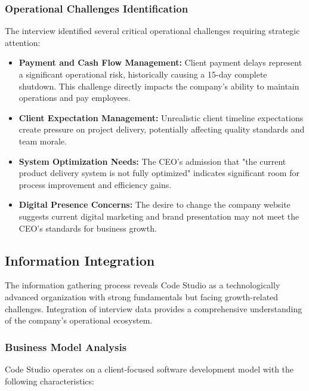 \documentclass[12pt,a4paper]{article}
\begin{document}
\subsubsection{Operational Challenges Identification}

The interview identified several critical operational challenges requiring strategic attention:

\begin{itemize}
    \item \textbf{Payment and Cash Flow Management:} Client payment delays represent a significant operational risk, historically causing a 15-day complete shutdown. This challenge directly impacts the company's ability to maintain operations and pay employees.
    
    \item \textbf{Client Expectation Management:} Unrealistic client timeline expectations create pressure on project delivery, potentially affecting quality standards and team morale.
    
    \item \textbf{System Optimization Needs:} The CEO's admission that "the current product delivery system is not fully optimized" indicates significant room for process improvement and efficiency gains.
    
    \item \textbf{Digital Presence Concerns:} The desire to change the company website suggests current digital marketing and brand presentation may not meet the CEO's standards for business growth.
\end{itemize}

\subsection{Information Integration}

The information gathering process reveals Code Studio as a technologically advanced organization with strong fundamentals but facing growth-related challenges. Integration of interview data provides a comprehensive understanding of the company's operational ecosystem.

\subsubsection{Business Model Analysis}

Code Studio operates on a client-focused software development model with the following characteristics:
\end{document}
